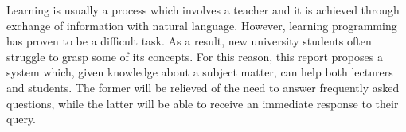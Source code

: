 \documentclass[12pt,a4paper]{article}
\begin{document}
Learning is usually a process which involves a teacher and it is achieved through exchange of information with natural language. However, learning programming has proven to be a difficult task. As a result, new university students often struggle to grasp some of its concepts. For this reason, this report proposes a system which, given knowledge about a subject matter, can help both lecturers and students. The former will be relieved of the need to answer frequently asked questions, while the latter will be able to receive an immediate response to their query.

%

%
%
%
\end{document}
